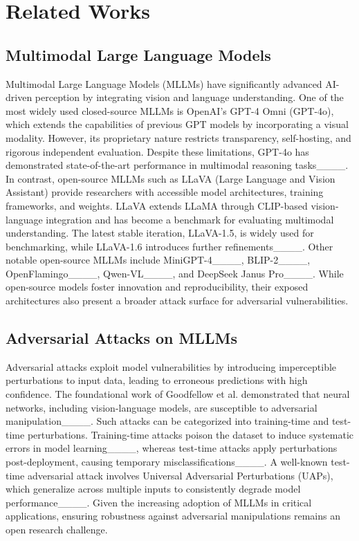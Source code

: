 \section{Related Works}
\subsection{Multimodal Large Language Models}
Multimodal Large Language Models (MLLMs) have significantly advanced AI-driven perception by integrating vision and language understanding. One of the most widely used closed-source MLLMs is OpenAI’s GPT-4 Omni (GPT-4o), which extends the capabilities of previous GPT models by incorporating a visual modality. However, its proprietary nature restricts transparency, self-hosting, and rigorous independent evaluation. Despite these limitations, GPT-4o has demonstrated state-of-the-art performance in multimodal reasoning tasks____. In contrast, open-source MLLMs such as LLaVA (Large Language and Vision Assistant) provide researchers with accessible model architectures, training frameworks, and weights. LLaVA extends LLaMA through CLIP-based vision-language integration and has become a benchmark for evaluating multimodal understanding. The latest stable iteration, LLaVA-1.5, is widely used for benchmarking, while LLaVA-1.6 introduces further refinements____. Other notable open-source MLLMs include MiniGPT-4____, BLIP-2____, OpenFlamingo____, Qwen-VL____, and DeepSeek Janus Pro____. While open-source models foster innovation and reproducibility, their exposed architectures also present a broader attack surface for adversarial vulnerabilities.

\subsection{Adversarial Attacks on MLLMs}
Adversarial attacks exploit model vulnerabilities by introducing imperceptible perturbations to input data, leading to erroneous predictions with high confidence. The foundational work of Goodfellow et al. demonstrated that neural networks, including vision-language models, are susceptible to adversarial manipulation____. Such attacks can be categorized into training-time and test-time perturbations. Training-time attacks poison the dataset to induce systematic errors in model learning____, whereas test-time attacks apply perturbations post-deployment, causing temporary misclassifications____. A well-known test-time adversarial attack involves Universal Adversarial Perturbations (UAPs), which generalize across multiple inputs to consistently degrade model performance____. Given the increasing adoption of MLLMs in critical applications, ensuring robustness against adversarial manipulations remains an open research challenge.


